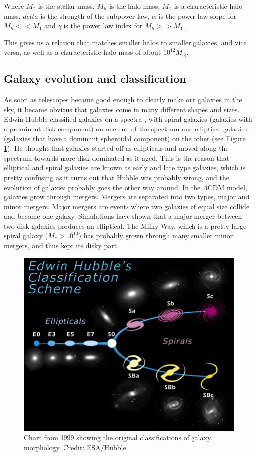 Where $M_*$ is the stellar mass, $M_h$ is the halo mass, $M_1$ is a characteristic halo mass, $delta$ is the strength of the subpower law, $\alpha$ is the power law slope for $M_h << M_1$ and $\gamma$ is the power law index for $M_h >> M_1$.

This gives us a relation that matches smaller halos to smaller galaxies, and vice versa, as well as a characteristic halo mass of about $10^{12}M_{\odot}$.

\subsection{Galaxy evolution and classification}
As soon as telescopes became good enough to clearly make out galaxies in the sky, it became obvious that galaxies come in many different shapes and sizes. Edwin Hubble classified galaxies on a spectra \parencite{Hubble1926}, with spiral galaxies (galaxies with a prominent disk component) on one end of the spectrum and elliptical galaxies (galaxies that have a dominant spheroidal component) on the other (see Figure \ref{hubble}). He thought that galaxies started off as ellipticals and moved along the spectrum towards more disk-dominated as it aged. This is the reason that elliptical and spiral galaxies are known as early and late type galaxies, which is pretty confusing as it turns out that Hubble was probably wrong, and the evolution of galaxies probably goes the other way around. In the $\Lambda$CDM model, galaxies grow through mergers. Mergers are separated into two types, major and minor mergers.  Major mergers are events where two galaxies of equal size collide and become one galaxy. Simulations have shown that a major merger between two disk galaxies produces an elliptical. The Milky Way, which is a pretty large spiral galaxy ($M_*>10^{10}$) has probably grown through many smaller minor mergers, and thus kept its disky part.

\begin{figure}
    \centering
    \includegraphics[width=\textwidth]{images/hubble.jpg}
    \caption{Chart from 1999 showing the original classifications of galaxy morphology. Credit: ESA/Hubble}
    \label{hubble}
\end{figure}

